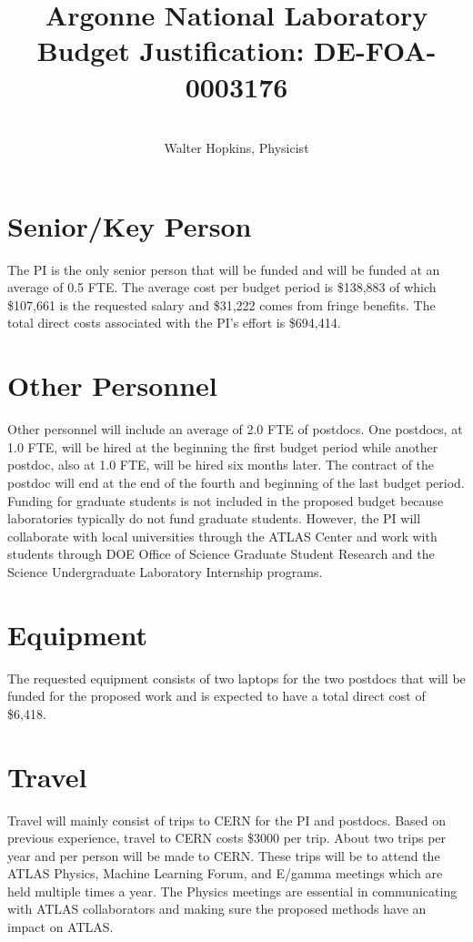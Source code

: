 \documentclass[letter, USenglish, 11pt, subfigure]{article}
\title{Argonne National Laboratory\\Budget Justification: DE-FOA-0003176}
\author{\\ Walter Hopkins, Physicist\\
}
\date{}
\begin{document}
\maketitle
\thispagestyle{firststyle}

\section{Senior/Key Person}
\label{subsec:keyPerson}
The PI is the only senior person that will be funded and will be funded at an average of 0.5 FTE. The average cost per budget period is \$138,883 of which \$107,661 is the requested salary and \$31,222 comes from fringe benefits. The total direct costs associated with the PI's effort is \$694,414.

\section{Other Personnel}
\label{subsec:personnel}
Other personnel will include an average of 2.0 FTE of postdocs. One postdocs, at 1.0 FTE, will be hired at the beginning the first budget period while another postdoc, also at 1.0 FTE, will be hired six months later. The contract of the postdoc will end at the end of the fourth and beginning of the last budget period. Funding for graduate students is not included in the proposed budget because laboratories typically do not fund graduate students. However, the PI will collaborate with local universities through the ATLAS Center and work with students through DOE Office of Science Graduate Student Research and the Science Undergraduate Laboratory Internship programs.

\section{Equipment}
\label{subsec:Equipment}
The requested equipment consists of two laptops for the two postdocs that will be funded for the proposed work and is expected to have a total direct cost of \$6,418. 

\section{Travel}
\label{subsec:travel}
Travel will mainly consist of trips to CERN for the PI and postdocs. Based on previous experience, travel to CERN costs \$3000 per trip. About two trips per year and per person will be made to CERN. These trips will be to attend the ATLAS Physics, Machine Learning Forum, and E/gamma meetings which are held multiple times a year. The Physics meetings are essential in communicating with ATLAS collaborators and making sure the proposed methods have an impact on ATLAS.
\end{document}
